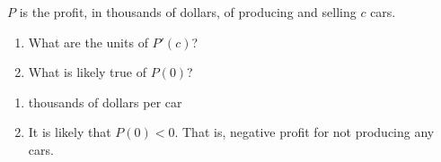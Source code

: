 {$P$ is the profit, in thousands of dollars, of producing and selling $c$ cars.
\begin{enumerate}
\item		What are the units of $P'(c)$?
\item		What is likely true of $P(0)$?
\end{enumerate}
}
{\begin{enumerate}
\item		thousands of dollars per car
\item		It is likely that $P(0)<0$. That is, negative profit for not producing any cars.
\end{enumerate}
}
